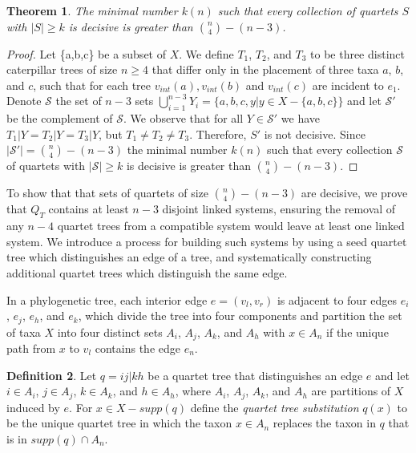 \documentclass[final,3p,times]{elsarticle}
\newtheorem{thm}{Theorem}[section]
\theoremstyle{definition}
\newtheorem{defn}[thm]{Definition}
\theoremstyle{remark}
\begin{document}
\begin{thm}
The minimal number $k(n)$ such that every collection of quartets $S$  with $|S| \geq k$ is decisive is greater than ${n \choose 4} - (n-3)$.
\label{ge}
\end{thm}
\begin{proof} 
Let \{a,b,c\} be a subset of $X$. We define $T_1$, $T_2$, and $T_3$ to be three distinct caterpillar trees of size $n \geq 4$ that differ only in the placement of three taxa $a$, $b$, and $c$, such that for each tree $v_{int}(a), v_{int}(b)$ and $v_{int}(c)$ are incident to $e_1$. Denote $\mathcal{S}$ the set of $n-3$ sets $\displaystyle\bigcup_{i=1}^{n-3}Y_i=\{a,b,c,y|y \in X-\{a,b,c\}\}$ and let $\mathcal{S'}$ be the complement of $\mathcal{S}$. We observe that for all $Y\in \mathcal{S'}$ we have $T_1|Y=T_2|Y=T_3|Y$, but $T_1 \neq T_2 \neq T_3$.  Therefore, $S'$ is not decisive.  Since $|\mathcal{S'}|={n \choose 4} - (n-3)$ the minimal number $k(n)$ such that every collection $\mathcal{S}$ of quartets with $|\mathcal{S}| \geq k$ is decisive is greater than ${n \choose 4} - (n-3)$.
\end{proof}

To show that that sets of quartets of size ${n \choose 4} - (n-3)$ are decisive, we prove that $Q_T$  contains at least $n-3$ disjoint linked systems, ensuring the removal of any $n-4$ quartet trees from a compatible system would leave at least one linked system. We introduce a process for building such systems by using a seed quartet tree which distinguishes an edge of a tree, and systematically constructing additional quartet trees which distinguish the same edge.

In a phylogenetic tree, each interior edge $e=(v_l,v_r)$ is adjacent to four edges $e_i$, $e_j$, $e_h$, and $e_k$, which divide the tree into four components and partition the set of taxa $X$ into four distinct sets $A_i$, $A_j$, $A_k$, and $A_h$ with $x \in A_n$ if the unique path from $x$ to $v_l$ contains the edge $e_n$. 

\begin{defn} Let $q=ij|kh$ be a quartet tree that distinguishes an edge $e$ and let $i \in A_i$, $j \in A_j$, $k \in A_k$, and $h \in A_h$, where $A_i$, $A_j$, $A_k$, and $A_h$ are partitions of $X$ induced by $e$. For $x\in X - supp(q)$  define the \emph{quartet tree substitution} $q(x)$ to be the unique quartet tree in which the taxon $x \in A_n$ replaces the taxon in $q$ that is in $supp(q) \cap A_n$.
\end{defn}
\end{document}
